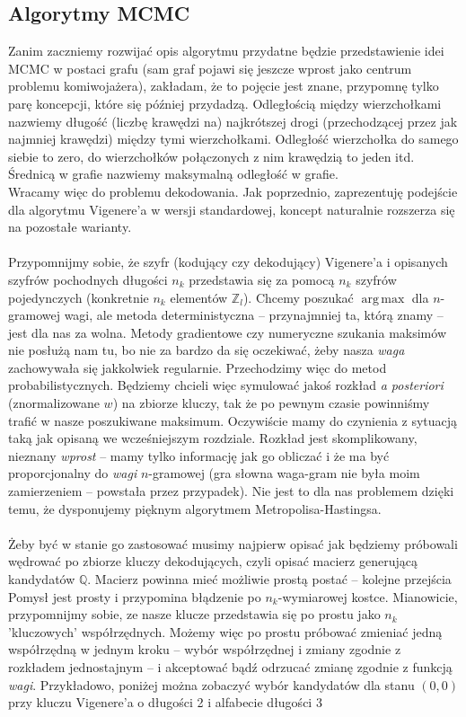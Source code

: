 \documentclass[a4paper]{article}
\DeclareMathOperator*{\argmax}{arg\,max}
\begin{document}
\subsection{Algorytmy MCMC}
Zanim zaczniemy rozwijać opis algorytmu przydatne będzie przedstawienie idei MCMC w postaci grafu (sam graf pojawi się jeszcze wprost jako centrum problemu komiwojażera), zakładam, że to pojęcie jest znane, przypomnę tylko parę koncepcji, które się później przydadzą. Odległością między wierzchołkami nazwiemy długość (liczbę krawędzi na) najkrótszej drogi (przechodzącej przez jak najmniej krawędzi) między tymi wierzchołkami. Odległość wierzchołka do samego siebie to zero, do wierzchołków połączonych z nim krawędzią to jeden itd. Średnicą w grafie nazwiemy maksymalną odległość w grafie.\\
Wracamy więc do problemu dekodowania. Jak poprzednio, zaprezentuję podejście dla algorytmu Vigenere'a w wersji standardowej, koncept naturalnie rozszerza się na pozostałe warianty. \\\\
Przypomnijmy sobie, że szyfr (kodujący czy dekodujący) Vigenere'a i opisanych szyfrów pochodnych długości $n_k$ przedstawia się za pomocą $n_k$ szyfrów pojedynczych (konkretnie $n_k$ elementów $\mathbb{Z}_l$). Chcemy poszukać $\argmax$ dla $n$-gramowej wagi, ale metoda deterministyczna – przynajmniej ta, którą znamy – jest dla nas za wolna. Metody gradientowe czy numeryczne szukania maksimów nie posłużą nam tu, bo nie za bardzo da się oczekiwać, żeby nasza \textit{waga} zachowywała się jakkolwiek regularnie. Przechodzimy więc do metod probabilistycznych. Będziemy chcieli więc symulować jakoś rozkład \textit{a posteriori} (znormalizowane $w$) na zbiorze kluczy, tak że po pewnym czasie powinniśmy trafić w nasze poszukiwane maksimum. Oczywiście mamy do czynienia z sytuacją taką jak opisaną we wcześniejszym rozdziale. Rozkład jest skomplikowany, nieznany \textit{wprost} – mamy tylko informację jak go obliczać i że ma być proporcjonalny do \textit{wagi} $n$-gramowej (gra słowna waga-gram nie była moim zamierzeniem – powstała przez przypadek).  Nie jest to dla nas problemem dzięki temu, że dysponujemy pięknym algorytmem Metropolisa-Hastingsa.\\\\
Żeby być w stanie go zastosować musimy najpierw opisać jak będziemy próbowali wędrować po zbiorze kluczy dekodujących, czyli opisać macierz generującą kandydatów $\mathbb{Q}$. Macierz powinna mieć możliwie prostą postać – kolejne przejścia Pomysł jest prosty i przypomina błądzenie po $n_k$-wymiarowej kostce. Mianowicie, przypomnijmy sobie, ze nasze klucze przedstawia się po prostu jako $n_k$ 'kluczowych' współrzędnych. Możemy więc po prostu próbować zmieniać jedną współrzędną w jednym kroku – wybór współrzędnej i zmiany zgodnie z rozkładem jednostajnym – i akceptować bądź odrzucać zmianę zgodnie z funkcją \textit{wagi}. Przykładowo, poniżej można zobaczyć wybór kandydatów dla stanu $(0,0)$ przy kluczu Vigenere'a o długości 2 i alfabecie długości 3  \\\\
\end{document}
